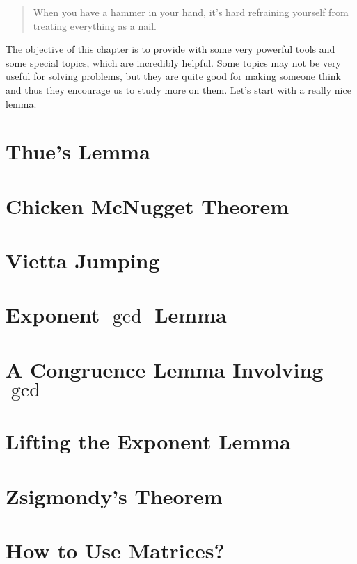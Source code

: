 \documentclass{subfile}
\begin{document}
	\begin{quote}\ttfamily
		When you have a hammer in your hand, it's hard refraining yourself from treating everything as a nail.
	\end{quote}
	The objective of this chapter is to provide with some very powerful tools and some special topics, which are incredibly helpful. Some topics may not be very useful for solving problems, but they are quite good for making someone think and thus they encourage us to study more on them. Let's start with a really nice lemma.

	\section{Thue's Lemma}
	

	\section{Chicken McNugget Theorem}
	

	\section{Vietta Jumping}
	

	\section{Exponent \texorpdfstring{${\gcd}$}{gcd} Lemma}
	

	\section{A Congruence Lemma Involving \texorpdfstring{${\gcd}$}{gcd}}
	

	\section{Lifting the Exponent Lemma}
	

	\section{Zsigmondy's Theorem}

	

	\section{How to Use Matrices?}
		
\end{document}
